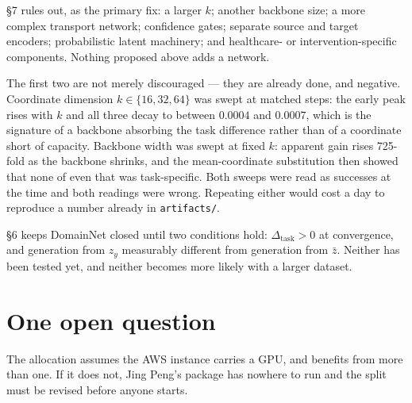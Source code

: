 \documentclass[11pt]{article}
\newcommand{\code}[1]{\texttt{\small #1}}
\newcommand{\dtask}{\Delta_{\mathrm{task}}}
\begin{document}
\S7 rules out, as the primary fix: a larger $k$; another backbone size; a more complex
transport network; confidence gates; separate source and target encoders; probabilistic
latent machinery; and healthcare- or intervention-specific components. Nothing proposed
above adds a network.

The first two are not merely discouraged --- they are already done, and negative.
Coordinate dimension $k \in \{16,32,64\}$ was swept at matched steps: the early peak rises
with $k$ and all three decay to between $0.0004$ and $0.0007$, which is the signature of a
backbone absorbing the task difference rather than of a coordinate short of capacity.
Backbone width was swept at fixed $k$: apparent gain rises 725-fold as the backbone
shrinks, and the mean-coordinate substitution then showed that none of even that was
task-specific. Both sweeps were read as successes at the time and both readings were
wrong. Repeating either would cost a day to reproduce a number already in
\code{artifacts/}.

\S6 keeps DomainNet closed until two conditions hold: $\dtask > 0$ at convergence, and
generation from $z_y$ measurably different from generation from $\bar z$. Neither has been
tested yet, and neither becomes more likely with a larger dataset.

\section*{One open question}

The allocation assumes the AWS instance carries a GPU, and benefits from more than one.
If it does not, Jing Peng's package has nowhere to run and the split must be revised
before anyone starts.
\end{document}
